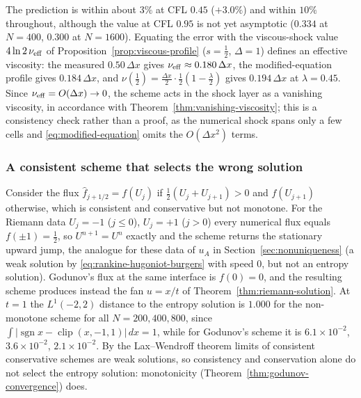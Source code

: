 The prediction is within about $3\%$ at CFL $0.45$ ($+3.0\%$) and within $10\%$
throughout, although the value at CFL $0.95$ is not yet asymptotic ($0.334$ at
$N=400$, $0.300$ at $N=1600$). Equating the error with the viscous-shock value
$4\ln2\,\nu_{\rm eff}$ of Proposition~\ref{prop:viscous-profile} ($s=\tfrac12$,
$\Delta=1$) defines an effective viscosity: the measured $0.50\,\Delta x$ gives
$\nu_{\rm eff}\approx0.180\,\Delta x$, the modified-equation profile gives
$0.184\,\Delta x$, and $\nu(\tfrac12)=\tfrac{\Delta x}2\cdot\tfrac12(1-\tfrac\lambda2)$
gives $0.194\,\Delta x$ at $\lambda=0.45$. Since $\nu_{\rm eff}=O(\Delta x)\to0$,
the scheme acts in the shock layer as a vanishing viscosity, in accordance with
Theorem~\ref{thm:vanishing-viscosity}; this is a consistency check rather than a
proof, as the numerical shock spans only a few cells and
\eqref{eq:modified-equation} omits the $O(\Delta x^2)$ terms.

\subsubsection{A consistent scheme that selects the wrong solution}
\label{subsubsec:non-entropy}

Consider the flux $\widehat f_{j+1/2}=f(U_j)$ if $\tfrac12(U_j+U_{j+1})>0$ and
$f(U_{j+1})$ otherwise, which is consistent and conservative but not monotone.
For the Riemann data $U_j=-1$ ($j\le0$), $U_j=+1$ ($j>0$) every numerical flux
equals $f(\pm1)=\tfrac12$, so $U^{n+1}=U^n$ exactly and the scheme returns the
stationary upward jump, the analogue for these data of $u_A$ in
Section~\ref{sec:nonuniqueness} (a weak solution by
\eqref{eq:rankine-hugoniot-burgers} with speed $0$, but not an entropy solution).
Godunov's flux at the same interface is $f(0)=0$, and the resulting scheme
produces instead the fan $u=x/t$ of Theorem~\ref{thm:riemann-solution}. At $t=1$ the $L^1(-2,2)$
distance to the entropy solution is $1.000$ for the non-monotone scheme for all
$N=200,400,800$, since $\int|\operatorname{sgn}x-\operatorname{clip}(x,-1,1)|\,dx=1$, while for
Godunov's scheme it is $6.1\times10^{-2}$, $3.6\times10^{-2}$,
$2.1\times10^{-2}$. By the Lax--Wendroff theorem \cite[Ch.~12]{leveque2002}
limits of consistent conservative schemes are weak solutions, so consistency and
conservation alone do not select the entropy solution: monotonicity
(Theorem~\ref{thm:godunov-convergence}) does.